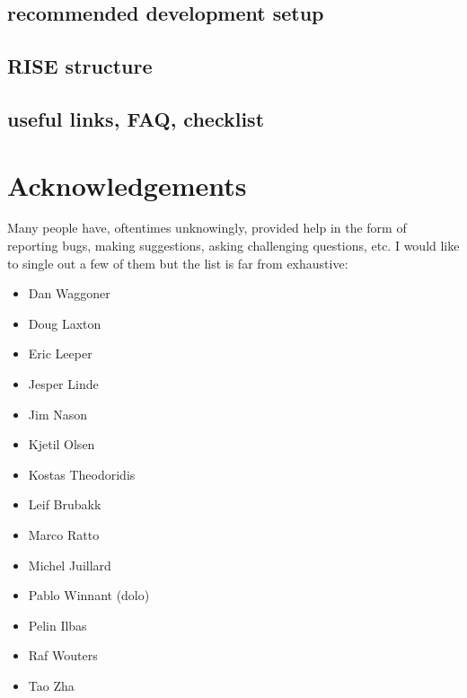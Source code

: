 \documentclass[letterpaper,10pt,english]{sphinxmanual}
\begin{document}
\section{recommended development setup}
\label{contributing:recommended-development-setup}

\section{RISE structure}
\label{contributing:rise-structure}

\section{useful links, FAQ, checklist}
\label{contributing:useful-links-faq-checklist}

\chapter{Acknowledgements}
\label{acknowledgements:acknowledgements}\label{acknowledgements::doc}
Many people have, oftentimes unknowingly, provided help in the form of reporting bugs, making suggestions, asking challenging questions, etc.
I would like to single out a few of them but the list is far from exhaustive:
\begin{itemize}
\item {} 
Dan Waggoner

\item {} 
Doug Laxton

\item {} 
Eric Leeper

\item {} 
Jesper Linde

\item {} 
Jim Nason

\item {} 
Kjetil Olsen

\item {} 
Kostas Theodoridis

\item {} 
Leif Brubakk

\item {} 
Marco Ratto

\item {} 
Michel Juillard

\item {} 
Pablo Winnant (dolo)

\item {} 
Pelin Ilbas

\item {} 
Raf Wouters

\item {} 
Tao Zha

\end{itemize}
\end{document}

